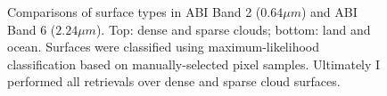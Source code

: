 \documentclass[12pt]{article}
\begin{document}
\begin{figure}[h!]
\begin{center}
{        }
    \end{center}
    \caption{Comparisons of surface types in ABI Band 2 ($0.64\mu m$) and ABI Band 6 ($2.24\mu m$). Top: dense and sparse clouds; bottom: land and ocean. Surfaces were classified using maximum-likelihood classification based on manually-selected pixel samples. Ultimately I performed all retrievals over dense and sparse cloud surfaces.}
    \label{domain_rgbs}
\end{figure}

\clearpage

\begin{figure}[h!]
    \centering
    \begin{center}
\end{center}
\end{figure}
\end{document}
